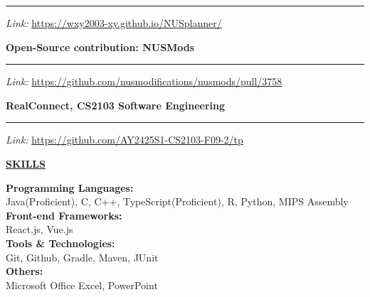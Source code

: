 \documentclass{article}
\begin{document}
\noindent\rule{\linewidth}{0.4pt} %
\textit{Link:} \href{https://wxy2003-xy.github.io/NUSplanner/}{https://wxy2003-xy.github.io/NUSplanner/} \\
\textbullet{} 
\vspace{0.4cm}

\noindent \textbf{Open-Source contribution: NUSMods} \\
\vspace{-0.7cm} %

\noindent\rule{\linewidth}{0.4pt} %
\textit{Link:} \href{https://github.com/nusmodifications/nusmods/pull/3758}{https://github.com/nusmodifications/nusmods/pull/3758} \\
\textbullet{} 
\vspace{0.4cm}

\noindent \textbf{RealConnect, CS2103 Software Engineering} \\
\vspace{-0.7cm} %

\noindent\rule{\linewidth}{0.4pt} %
\textit{Link:} \href{https://github.com/AY2425S1-CS2103-F09-2/tp}{https://github.com/AY2425S1-CS2103-F09-2/tp} \\
\textbullet{} 
\vspace{0.4cm}


\noindent \textbf{\underline{SKILLS}} \\
\vspace{-0.2cm}

\noindent \textbf{Programming Languages:} \\
\indent Java(Proficient), C, C++, TypeScript(Proficient), R, Python, MIPS Assembly \\
\noindent \textbf{Front-end Frameworks:}\\ \indent React.js, Vue.js\\
\noindent \textbf{Tools \& Technologies:}\\ \indent Git, Github, Gradle, Maven, JUnit\\
\noindent \textbf{Others:}\\ \indent Microsoft Office Excel, PowerPoint\\
\end{document}
